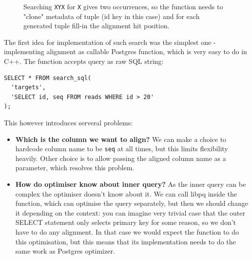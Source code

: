 \begin{figure}[htbp]
\centering
{}
\caption{Searching \texttt{XYX} for \texttt{X} gives two occurrences, so the function needs to "clone" metadata of tuple (id key in this case) and for each generated tuple fill-in the alignment hit position.}
\label{fig:scan-occurrences}
\end{figure}

The first idea for implementation of such search was the simplest one - implementing alignment as callable Postgres function, which is very easy to do in C++. The function accepts query as raw SQL string:

\begin{minipage}{\linewidth}
\begin{lstlisting}[style=bioseq-search-sql,caption={An early interface sketch passes SQL as text.}]
SELECT * FROM search_sql(
  'targets',
  'SELECT id, seq FROM reads WHERE id > 20'
);
\end{lstlisting}
\end{minipage}

This however introduces serveral problems:
\begin{itemize}
  \item \textbf{Which is the column we want to align?} We can make a choice to hardcode column name to be \texttt{seq} at all times, but this limits flexibility heavily.
   Other choice is to allow passing the aligned column name as a parameter, which resolves this problem.
  \item \textbf{How do optimiser know about inner query?} As the inner query can be complex the optimiser doesn't know about it. We can call libpq inside the function, which can optimise the query separately, but
  then we should change it depending on the context: you can imagine very trivial case that the outer SELECT statement only selects primary key for some reason, so we don't have to do any alignment. In that case
  we would expect the function to do this optimisation, but this means that its implementation needs to do the same work as Postgres optimizer.
\end{itemize}


